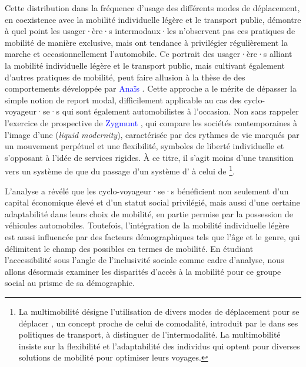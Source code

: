 \begin{refsegment}
Cette distribution dans la fréquence d'usage des différents modes de déplacement, en coexistence avec la mobilité individuelle légère et le transport public, démontre à quel point les usager·ère·s intermodaux·les n'observent pas ces pratiques de mobilité de manière exclusive, mais ont tendance à privilégier régulièrement la marche et occasionnellement l'automobile. Ce portrait des usager·ère·s alliant la mobilité individuelle légère et le transport public, mais cultivant également d'autres pratiques de mobilité, peut faire allusion à la thèse de  des comportements développée par \textcolor{blue}{Anaïs} \textcolor{blue}{\textcite[16]{rocci_automobilite_2007}}. Cette approche a le mérite de dépasser la simple notion de report modal, difficilement applicable au cas des cyclo-voyageur·se·s qui sont également automobilistes à l'occasion. Non sans rappeler l'exercice de prospective de \textcolor{blue}{Zygmunt} \textcolor{blue}{\textcite[7-28]{bauman_liquid_2000}}, qui compare les sociétés contemporaines à l'image d'une  (\textsl{liquid modernity}), caractérisée par des rythmes de vie marqués par un mouvement perpétuel et une flexibilité, symboles de liberté individuelle et s'opposant à l'idée de services rigides. À ce titre, il s'agit moins d'une transition vers un système de  \textcolor{blue}{\autocite[492]{watson_how_2012}} que du passage d'un système d' \textcolor{blue}{\autocites[57-58]{urry_sociology_2000}[28]{urry_system_2004}} à celui de \footnote{
    La multimobilité désigne l'utilisation de divers modes de déplacement pour se déplacer \textcolor{blue}{\autocite[10]{rocci_automobilite_2007}}, un concept proche de celui de comodalité, introduit par le \textcolor{blue}{\textcite[6]{parlement_europeen_pour_2007}} dans ses politiques de transport, à distinguer de l'intermodalité. La multimobilité insiste sur la flexibilité et l'adaptabilité des individus qui optent pour diverses solutions de mobilité pour optimiser leurs voyages.
}.%

L'analyse a révélé que les cyclo-voyageur·se·s bénéficient non seulement d'un capital économique élevé et d'un statut social privilégié, mais aussi d'une certaine adaptabilité dans leurs choix de mobilité, en partie permise par la possession de véhicules automobiles. Toutefois, l'intégration de la mobilité individuelle légère est aussi influencée par des facteurs démographiques tels que l'âge et le genre, qui délimitent le champ des possibles en termes de mobilité. En étudiant l'accessibilité sous l'angle de l'inclusivité sociale comme cadre d'analyse, nous allons désormais examiner les disparités d'accès à la mobilité pour ce groupe social au prisme de sa démographie.%


\end{refsegment}
